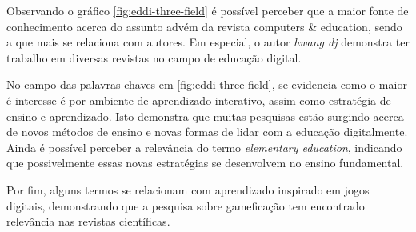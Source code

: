 Observando o gráfico \ref{fig:eddi-three-field} é possível perceber que a maior fonte de conhecimento acerca do assunto advém da revista computers \& education, sendo a que mais se relaciona com autores. Em especial, o autor \textit{hwang dj} demonstra ter trabalho em diversas revistas no campo de educação digital.

No campo das palavras chaves em \ref{fig:eddi-three-field}, se evidencia como o maior é interesse é por ambiente de aprendizado interativo, assim como estratégia de ensino e aprendizado. Isto demonstra que muitas pesquisas estão surgindo acerca de novos métodos de ensino e novas formas de lidar com a educação digitalmente. Ainda é possível perceber a relevância do termo \textit{elementary education}, indicando que possivelmente essas novas estratégias se desenvolvem no ensino fundamental.

Por fim, alguns termos se relacionam com aprendizado inspirado em jogos digitais, demonstrando que a pesquisa sobre gameficação tem encontrado relevância nas revistas científicas.



